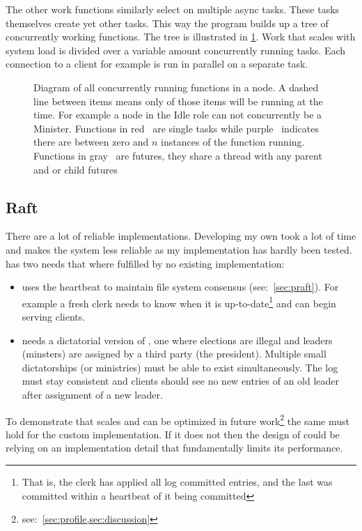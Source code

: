 The other work functions similarly select on multiple async tasks. These tasks themselves create yet other tasks. This way the program builds up a tree of concurrently working functions. The tree is illustrated in \cref{fig:tree}. Work that scales with system load is divided over a variable amount concurrently running tasks. Each connection to a client for example is run in parallel on a separate task.
%
\clearpage
\thispagestyle{empty}
\begin{figure}[htbp]
	\centering
	
	\caption{Diagram of all concurrently running functions in a node. A dashed line between items means only of those items will be running at the time. For example a node in the Idle role can not concurrently be a Minister. Functions in red~\taskLeg{} are single tasks while purple~\tasksLeg{} indicates there are between zero and $n$ instances of the function running. Functions in gray~\futureLeg{} are futures, they share a thread with any parent and or child futures}
	\label{fig:tree}
\end{figure}
\clearpage

\subsection{Raft}
There are a lot of reliable \raft{} implementations. Developing my own took a lot of time and makes the system less reliable as my implementation has hardly been tested. \Name{} has two needs that where fulfilled by no existing implementation: 
%
\begin{itemize}
	\item \Name{} uses the \raft{} heartbeat to maintain file system consensus (see:~\cref{sec:praft}). For example a fresh clerk needs to know when it is up-to-date\footnote{That is, the clerk has applied all log committed entries, and the last was committed within a \raft{} heartbeat of it being committed} and can begin serving clients. 
	\item \Name{} needs a dictatorial version of \raft{}, one where elections are illegal and leaders (minsters) are assigned by a third party (the president). Multiple small dictatorships (or ministries) must be able to exist simultaneously. The log must stay consistent and clients should see no new entries of an old leader after assignment of a new leader. 
\end{itemize}
%
To demonstrate that \name{} scales and can be optimized in future work\footnote{see:~\cref{sec:profile,sec:discussion}} the same must hold for the custom implementation. If it does not then the design of \name{} could be relying on an implementation detail that fundamentally limits its performance.
%
